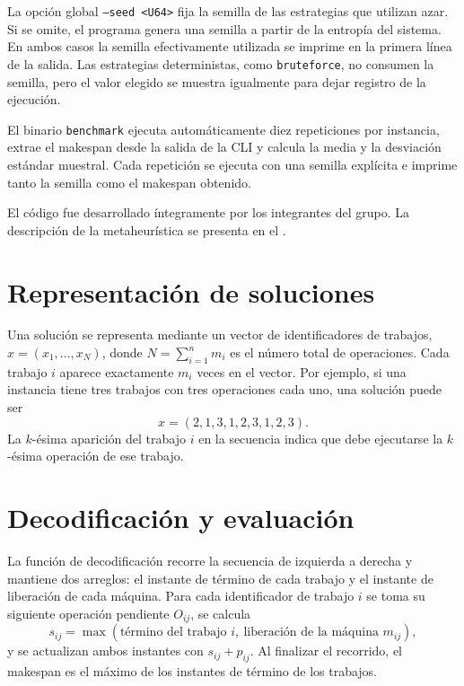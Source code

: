 La opción global \texttt{--seed <U64>} fija la semilla de las estrategias que utilizan azar.
Si se omite, el programa genera una semilla a partir de la entropía del sistema.
En ambos casos la semilla efectivamente utilizada se imprime en la primera línea de la salida.
Las estrategias deterministas, como \texttt{bruteforce}, no consumen la semilla, pero el valor
elegido se muestra igualmente para dejar registro de la ejecución.

El binario \texttt{benchmark} ejecuta automáticamente diez repeticiones por instancia,
extrae el makespan desde la salida de la CLI y calcula la media y la desviación estándar muestral.
Cada repetición se ejecuta con una semilla explícita e imprime tanto la semilla como el makespan obtenido. 

El código fue desarrollado íntegramente por los integrantes del grupo.
La descripción de la metaheurística se presenta en el .

\section{Representación de soluciones}

Una solución se representa mediante un vector de identificadores de trabajos,
\(x = (x_1,\ldots,x_N)\), donde \(N=\sum_{i=1}^{n} m_i\) es el número total de operaciones.
Cada trabajo \(i\) aparece exactamente \(m_i\) veces en el vector.
Por ejemplo, si una instancia tiene tres trabajos con tres operaciones cada uno, una solución puede ser
\[
    x = (2,1,3,1,2,3,1,2,3).
\]
La \(k\)-ésima aparición del trabajo \(i\) en la secuencia indica que
debe ejecutarse la \(k\)-ésima operación de ese trabajo.

\section{Decodificación y evaluación}

La función de decodificación recorre la secuencia de izquierda a derecha y mantiene dos arreglos:
el instante de término de cada trabajo y el instante de liberación de cada máquina.
Para cada identificador de trabajo \(i\) se toma su siguiente operación pendiente \(O_{ij}\), se calcula
\[
    s_{ij} = \max\left(\text{término del trabajo } i,\ \text{liberación de la máquina } m_{ij}\right),
\]
y se actualizan ambos instantes con \(s_{ij}+p_{ij}\).
Al finalizar el recorrido, el makespan es el máximo de los instantes de término de los trabajos.

